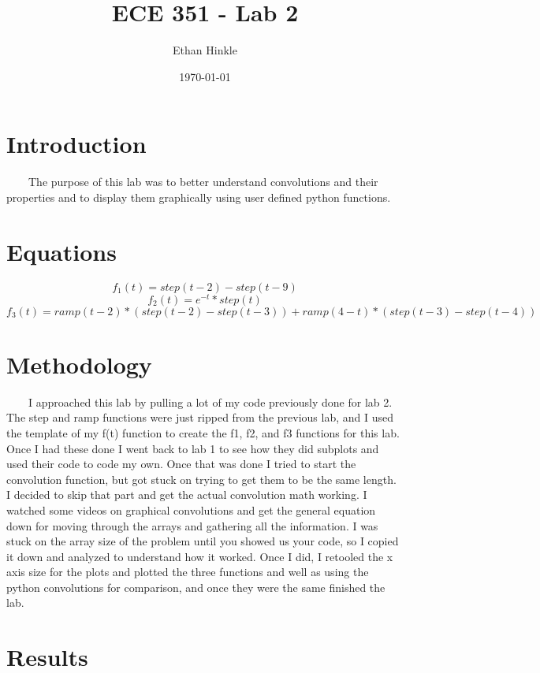 \documentclass[11pt,a4]{article}
\title{ECE 351 - Lab 2}
\author{Ethan Hinkle}
\date{\today}
\begin{document}
\maketitle

\section{Introduction}
\ \ \ \ The purpose of this lab was to better understand convolutions and their properties and to display them graphically using user defined python functions.

\section{Equations}

\begin{equation}
f_1(t) = step(t-2)-step(t-9)
\end{equation}
\begin{equation}
f_2(t) = e^{-t}*step(t)
\end{equation}
\begin{equation}
f_3(t) = ramp(t-2)*(step(t-2)-step(t-3))+ramp(4-t)*(step(t-3)-step(t-4))
\end{equation}

\section{Methodology}
\ \ \ \ I approached this lab by pulling a lot of my code previously done for lab 2. The step and ramp functions were just ripped from the previous lab, and I used the template of my f(t) function to create the f1, f2, and f3 functions for this lab. Once I had these done I went back to lab 1 to see how they did subplots and used their code to code my own. Once that was done I tried to start the convolution function, but got stuck on trying to get them to be the same length. I decided to skip that part and get the actual convolution math working. I watched some videos on graphical convolutions and get the general equation down for moving through the arrays and gathering all the information. I was stuck on the array size of the problem until you showed us your code, so I copied it down and analyzed to understand how it worked. Once I did, I retooled the x axis size for the plots and plotted the three functions and well as using the python convolutions for comparison, and once they were the same finished the lab.

\section{Results}
\end{document}
